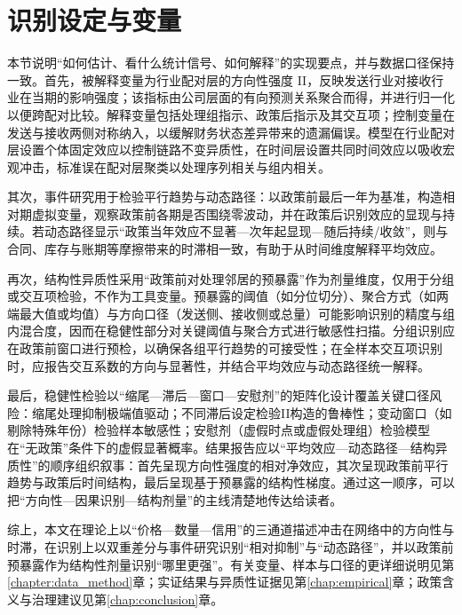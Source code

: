 \section{识别设定与变量}
本节说明“如何估计、看什么统计信号、如何解释”的实现要点，并与数据口径保持一致。首先，被解释变量为行业配对层的方向性强度 II，反映发送行业对接收行业在当期的影响强度；该指标由公司层面的有向预测关系聚合而得，并进行归一化以便跨配对比较。解释变量包括处理组指示、政策后指示及其交互项；控制变量在发送与接收两侧对称纳入，以缓解财务状态差异带来的遗漏偏误。模型在行业配对层设置个体固定效应以控制链路不变异质性，在时间层设置共同时间效应以吸收宏观冲击，标准误在配对层聚类以处理序列相关与组内相关。

其次，事件研究用于检验平行趋势与动态路径：以政策前最后一年为基准，构造相对期虚拟变量，观察政策前各期是否围绕零波动，并在政策后识别效应的显现与持续。若动态路径显示“政策当年效应不显著—次年起显现—随后持续/收敛”，则与合同、库存与账期等摩擦带来的时滞相一致，有助于从时间维度解释平均效应。

再次，结构性异质性采用“政策前对处理邻居的预暴露”作为剂量维度，仅用于分组或交互项检验，不作为工具变量。预暴露的阈值（如分位切分）、聚合方式（如两端最大值或均值）与方向口径（发送侧、接收侧或总量）可能影响识别的精度与组内混合度，因而在稳健性部分对关键阈值与聚合方式进行敏感性扫描。分组识别应在政策前窗口进行预检，以确保各组平行趋势的可接受性；在全样本交互项识别时，应报告交互系数的方向与显著性，并结合平均效应与动态路径统一解释。

最后，稳健性检验以“缩尾—滞后—窗口—安慰剂”的矩阵化设计覆盖关键口径风险：缩尾处理抑制极端值驱动；不同滞后设定检验II构造的鲁棒性；变动窗口（如剔除特殊年份）检验样本敏感性；安慰剂（虚假时点或虚假处理组）检验模型在“无政策”条件下的虚假显著概率。结果报告应以“平均效应—动态路径—结构异质性”的顺序组织叙事：首先呈现方向性强度的相对净效应，其次呈现政策前平行趋势与政策后时间结构，最后呈现基于预暴露的结构性梯度。通过这一顺序，可以把“方向性—因果识别—结构剂量”的主线清楚地传达给读者。

综上，本文在理论上以“价格—数量—信用”的三通道描述冲击在网络中的方向性与时滞，在识别上以双重差分与事件研究识别“相对抑制”与“动态路径”，并以政策前预暴露作为结构性剂量识别“哪里更强”。有关变量、样本与口径的更详细说明见第\ref{chapter:data_method}章；实证结果与异质性证据见第\ref{chap:empirical}章；政策含义与治理建议见第\ref{chap:conclusion}章。